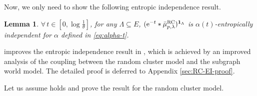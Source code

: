 \documentclass[11pt,a4paper]{article}
\newcommand{\e}{\mathrm{e}}
\newtheorem{lemma}[theorem]{Lemma}
\theoremstyle{definition}
\def\*#1{\mathbf{#1}} %
\begin{document}
Now, we only need to show the following entropic independence result.
\begin{lemma}\label{lem:RC-EI}
$\forall\, t\in [0,\log \frac{1}{\theta}]$, for any $\Lambda \subseteq E$,  $(\e^{-t} *\bar{\mu}_{p,\lambda}^{\textnormal{RC}})^{\*1_\Lambda}$ is $\alpha(t)$-entropically independent for  $\alpha$ defined in \eqref{eq:alpha-t}.
\end{lemma}

 improves the entropic independence result in \cite{CZ23}, which is achieved by an improved analysis of the coupling between the random cluster model and the subgraph world model. The detailed proof is deferred to Appendix \ref{sec:RC-EI-proof}.

Let us assume  holds and prove the result for the random cluster model.
\end{document}
